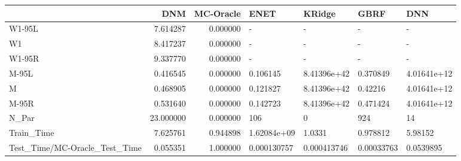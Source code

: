 \begin{tabular}{lrrllll}
\toprule
{} &        DNM &  MC-Oracle &         ENET &       KRidge &        GBRF &          DNN \\
\midrule
W1-95L                        &   7.614287 &   0.000000 &            - &            - &           - &            - \\
W1                            &   8.417237 &   0.000000 &            - &            - &           - &            - \\
W1-95R                        &   9.337770 &   0.000000 &            - &            - &           - &            - \\
M-95L                         &   0.416545 &   0.000000 &     0.106145 &  8.41396e+42 &    0.370849 &  4.01641e+12 \\
M                             &   0.468905 &   0.000000 &     0.121827 &  8.41396e+42 &     0.42216 &  4.01641e+12 \\
M-95R                         &   0.531640 &   0.000000 &     0.142723 &  8.41396e+42 &    0.471424 &  4.01641e+12 \\
N\_Par                         &  23.000000 &   0.000000 &          106 &            0 &         924 &           14 \\
Train\_Time                    &   7.625761 &   0.944898 &  1.62084e+09 &       1.0331 &    0.978812 &      5.98152 \\
Test\_Time/MC-Oracle\_Test\_Time &   0.055351 &   1.000000 &  0.000130757 &  0.000413746 &  0.00033763 &    0.0539895 \\
\bottomrule
\end{tabular}
